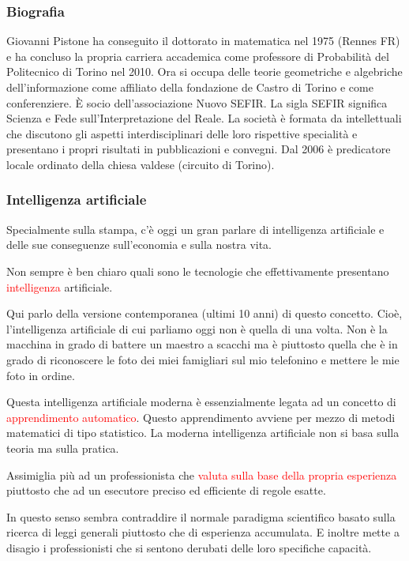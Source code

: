 \documentclass[xcolor=svgnames]{beamer}
\newcommand{\rosso}[1]{\textcolor{red}{#1}}
\renewcommand{\emph}{\rosso}
\begin{document}
\begin{frame}[plain]\tiny\frametitle{Biografia}
  Giovanni Pistone ha conseguito il dottorato in matematica nel 1975 (Rennes FR) e ha concluso la propria carriera accademica come professore di Probabilità del Politecnico di Torino nel 2010. Ora si occupa delle teorie geometriche e algebriche dell’informazione come affiliato della fondazione de Castro di Torino e come conferenziere. \`E socio dell’associazione Nuovo SEFIR. La sigla SEFIR significa Scienza e Fede sull’Interpretazione del Reale. La società è formata da intellettuali che discutono gli aspetti interdisciplinari delle loro rispettive specialità e presentano i propri risultati in pubblicazioni e convegni. Dal 2006 è predicatore locale ordinato della chiesa valdese (circuito di Torino).  
\end{frame}

\begin{frame}[plain]\small\frametitle{Intelligenza artificiale}

Specialmente sulla stampa, c'è oggi un gran parlare di intelligenza artificiale e delle sue conseguenze sull'economia e sulla nostra vita. 

Non sempre è ben chiaro quali sono le tecnologie che effettivamente presentano \emph{intelligenza} artificiale. 

Qui parlo della versione contemporanea (ultimi 10 anni) di questo concetto. Cioè, l'intelligenza artificiale di cui parliamo oggi non è quella di una volta. Non è la macchina in grado di battere un maestro a scacchi ma è piuttosto quella che è in grado di riconoscere le foto dei miei famigliari sul mio telefonino e mettere le mie foto in ordine.

Questa intelligenza artificiale moderna è essenzialmente legata ad un concetto di \emph{apprendimento automatico}. Questo apprendimento avviene per mezzo di metodi matematici di tipo statistico. La moderna intelligenza artificiale non si basa sulla teoria ma sulla pratica. 

Assimiglia più ad un professionista che \emph{valuta sulla base della propria esperienza} piuttosto che ad un esecutore preciso ed efficiente di regole esatte.

In questo senso sembra contraddire il normale paradigma scientifico basato sulla ricerca di leggi generali piuttosto che di esperienza accumulata. E inoltre mette a disagio i professionisti che si sentono derubati delle loro specifiche capacità.

\end{frame}
\end{document}

